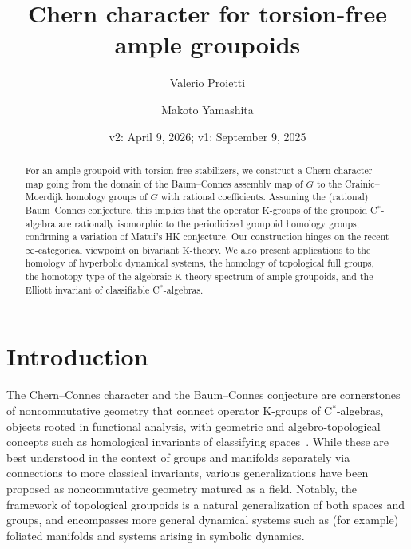\documentclass[a4paper,reqno]{amsart}
\author{Valerio Proietti}
\author{Makoto Yamashita}
\title{Chern character for torsion-free ample groupoids}
\theoremstyle{plain}
\theoremstyle{definition}
\theoremstyle{remark}
\numberwithin{equation}{section}
\newcommand{\rK}{\mathrm{K}}
\begin{document}
\begin{abstract}
For an ample groupoid with torsion-free stabilizers, we construct a Chern character map going from the domain of the Baum--Connes assembly map of $G$ to the Crainic--Moerdijk homology groups of $G$ with rational coefficients.
Assuming the (rational) Baum--Connes conjecture, this implies that the operator $\rK$-groups of the groupoid C$^*$-algebra are rationally isomorphic to the periodicized groupoid homology groups, confirming a variation of Matui's HK conjecture.
Our construction hinges on the recent $\infty$-categorical viewpoint on bivariant $\rK$-theory.
We also present applications to the homology of hyperbolic dynamical systems, the homology of topological full groups, the homotopy type of the algebraic $\rK$-theory spectrum of ample groupoids, and the Elliott invariant of classifiable C$^*$-algebras.
\end{abstract}

\makeatletter
{}
\makeatother

\date{v2: April 9, 2026; v1: September 9, 2025}

\maketitle
\setcounter{tocdepth}{1}
\tableofcontents

\section*{Introduction}

The Chern--Connes character and the Baum--Connes conjecture are cornerstones of noncommutative geometry that connect operator $\rK$-groups of C$^*$-algebras, objects rooted in functional analysis, with geometric and algebro-topological concepts such as homological invariants of classifying spaces~\cites{BCH:class,connes:ncg}.
While these are best understood in the context of groups and manifolds separately via connections to more classical invariants, various generalizations have been proposed as noncommutative geometry matured as a field.
Notably, the framework of topological groupoids is a natural generalization of both spaces and groups, and encompasses more general dynamical systems such as (for example) foliated manifolds and systems arising in symbolic dynamics.
\end{document}
